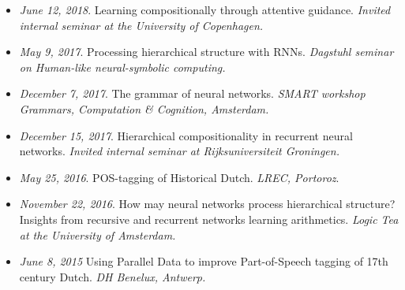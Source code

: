 \begin{itemize}
    \item \textit{June 12, 2018}. Learning compositionally through attentive guidance. \textit{Invited internal seminar at the University of Copenhagen.}
    \item \textit{May 9, 2017}. Processing hierarchical structure with RNNs.\textit{ Dagstuhl seminar on Human-like neural-symbolic computing.}
    \item \textit{December 7, 2017}. The grammar of neural networks. \textit{SMART workshop Grammars, Computation \& Cognition, Amsterdam.}
    \item \textit{December 15, 2017}. Hierarchical compositionality in recurrent neural networks. \textit{Invited internal seminar at Rijksuniversiteit Groningen.}
    \item \textit{May 25, 2016}. POS-tagging of Historical Dutch. \textit{LREC, Portoroz}.
    \item \textit{November 22, 2016}. How may neural networks process hierarchical structure? Insights from recursive and recurrent networks learning arithmetics. \textit{Logic Tea at the University of Amsterdam.}
    \item \textit{June 8, 2015} Using Parallel Data to improve Part-of-Speech tagging of 17th century Dutch. \textit{DH Benelux, Antwerp.}
\end{itemize}
